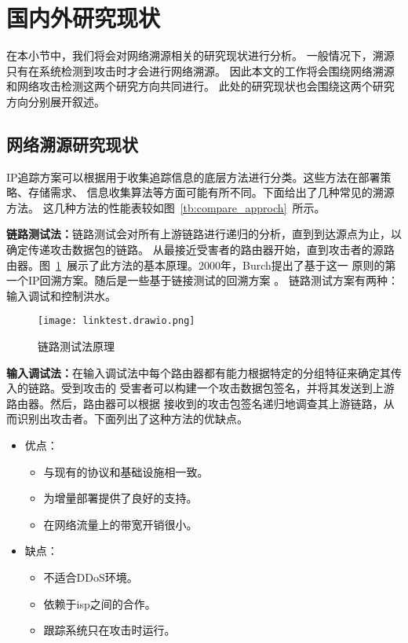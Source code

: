 \section{国内外研究现状}
在本小节中，我们将会对网络溯源相关的研究现状进行分析。
一般情况下，溯源只有在系统检测到攻击时才会进行网络溯源。
因此本文的工作将会围绕网络溯源和网络攻击检测这两个研究方向共同进行。
此处的研究现状也会围绕这两个研究方向分别展开叙述。

\subsection{网络溯源研究现状}
IP追踪方案可以根据用于收集追踪信息的底层方法进行分类。这些方法在部署策略、存储需求、
信息收集算法等方面可能有所不同。下面给出了几种常见的溯源方法\cite{singh2016}。
这几种方法的性能表较如图~\ref{tb:compare_approch}~所示。

\textbf{链路测试法：}链路测试会对所有上游链路进行递归的分析，直到到达源点为止，以确定传递攻击数据包的链路。
从最接近受害者的路由器开始，直到攻击者的源路由器。图~\ref{fig:linktest}~展示了此方法的基本原理。2000年，Burch提出了基于这一
原则的第一个IP回溯方案\cite{Burch2000Tracing}。随后是一些基于链接测试的回溯方案
\cite{HamediHamzehkolaie2012DOSTraceback,ShiYang2005DDoSDefense,
ThingSlomanDulay2008DDoSDetection}。
链路测试方案有两种：输入调试和控制洪水。

\begin{figure}[htbp]
  \centering
  \texttt{[image: linktest.drawio.png]}
  \caption{链路测试法原理}
  \label{fig:linktest}
\end{figure}

\textbf{输入调试法：}在输入调试法中每个路由器都有能力根据特定的分组特征来确定其传入的链路。受到攻击的
受害者可以构建一个攻击数据包签名，并将其发送到上游路由器。然后，路由器可以根据
接收到的攻击包签名递归地调查其上游链路，从而识别出攻击者。下面列出了这种方法的优缺点。
\begin{itemize}
  \item 优点：
    \begin{itemize}
    \item 与现有的协议和基础设施相一致。
    \item 为增量部署提供了良好的支持。
    \item 在网络流量上的带宽开销很小。
  \end{itemize}
\item 缺点：
  \begin{itemize}
    \item 不适合DDoS环境。
    \item 依赖于isp之间的合作。
    \item 跟踪系统只在攻击时运行。
  \end{itemize}
\end{itemize}


